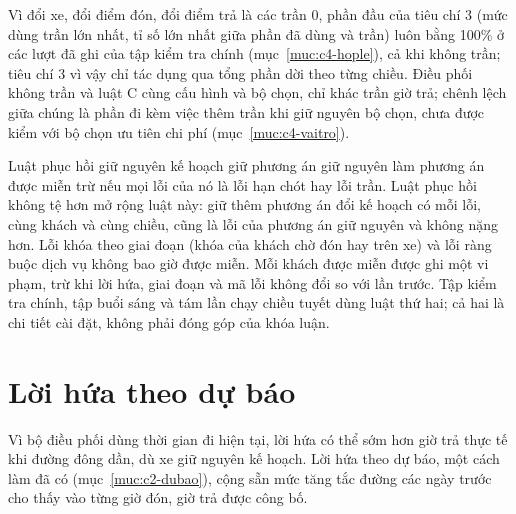 Vì đổi xe, đổi điểm đón, đổi điểm trả là các trần 0, phần đầu của tiêu chí 3 (mức dùng trần lớn nhất, tỉ số lớn
nhất giữa phần đã dùng và trần) luôn bằng 100\% ở các lượt đã ghi của tập kiểm tra chính (mục~\ref{muc:c4-hople}),
cả khi không trần; tiêu chí 3 vì vậy chỉ tác dụng qua tổng phần dời theo từng chiều. Điều phối không trần và luật C
cùng cấu hình và bộ chọn, chỉ khác trần giờ trả; chênh lệch giữa chúng là phần đi kèm việc thêm trần khi giữ nguyên
bộ chọn, chưa được kiểm với bộ chọn ưu tiên chi phí (mục~\ref{muc:c4-vaitro}).

Luật phục hồi giữ nguyên kế hoạch giữ phương án giữ nguyên làm phương án được miễn trừ nếu mọi lỗi của nó là lỗi
hạn chót hay lỗi trần. Luật phục hồi không tệ hơn mở rộng luật này: giữ thêm phương án đổi kế hoạch có mỗi lỗi,
cùng khách và cùng chiều, cũng là lỗi của phương án giữ nguyên và không nặng hơn. Lỗi khóa theo giai đoạn (khóa của
khách chờ đón hay trên xe) và lỗi ràng buộc dịch vụ không bao giờ được miễn. Mỗi khách được miễn được ghi một vi
phạm, trừ khi lời hứa, giai đoạn và mã lỗi không đổi so với lần trước. Tập kiểm tra chính, tập buổi sáng và tám
lần chạy chiều tuyết dùng luật thứ hai; cả hai là chi tiết cài đặt, không phải đóng góp của khóa luận.

\section{Lời hứa theo dự báo}
\label{muc:dubao}

Vì bộ điều phối dùng thời gian đi hiện tại, lời hứa có thể sớm hơn giờ trả thực tế khi đường đông dần, dù xe giữ
nguyên kế hoạch. Lời hứa theo dự báo, một cách làm đã có (mục~\ref{muc:c2-dubao}), cộng sẵn mức tăng tắc đường các
ngày trước cho thấy vào từng giờ đón, giờ trả được công bố.

